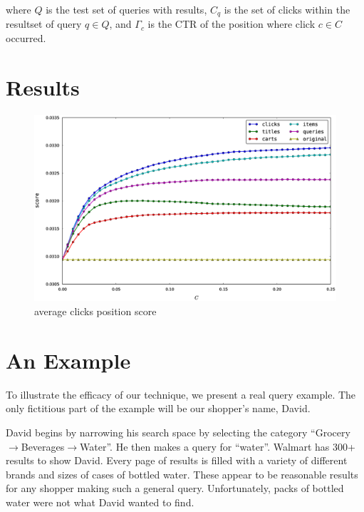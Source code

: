 \documentclass{article}
\begin{document}
where $Q$ is the test set of queries with results, $C_q$ is the set of clicks 
within the resultset of query $q \in Q$, and $\Gamma_c$ is the CTR of the position 
where click $c \in C$ occurred.

\section{Results}

\begin{figure}[htbp!]
    \centering
    \includegraphics[width=\textwidth]{000050_0_48chunk_k100_i2_n100_avg_click_position_score_0-0_25.eps}
    \caption{average clicks position score}
    \label{fig:avg_clicks_position_score}
\end{figure}

\section{An Example}

To illustrate the efficacy of our technique, we present a real query example.
The only fictitious part of the example will be our shopper's name, David.


David begins by narrowing his search space by selecting the category
``Grocery$\rightarrow$Beverages$\rightarrow$Water''. He then makes a query for
``water''. Walmart has 300+ results to show David. Every page of results is
filled with a variety of different brands and sizes of cases of bottled water.
These appear to be reasonable results for any shopper making such a general
query. Unfortunately, packs of bottled water were not what David wanted to find.
\end{document}
